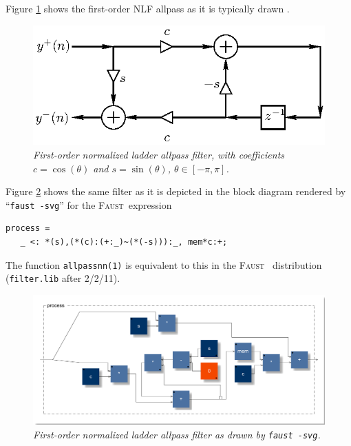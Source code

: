 \documentclass[twoside,a4paper]{article}
\newcommand{\Faust}{\textsc{Faust}}
\newcommand{\Faustsp}{\Faust\ }
\begin{document}
Figure \ref{nlf} shows the first-order NLF allpass as it is typically
drawn \cite{MG,PASP}.

\begin{figure}[ht]
\centerline{\includegraphics{eps/nlf.eps}}
\caption{\label{nlf}{\it First-order normalized ladder allpass filter, with
coefficients $c=\cos(\theta)$ and $s=\sin(\theta)$, $\theta\in[-\pi,\pi]$.}}
\end{figure}

Figure \ref{nlf1} shows the same filter as it is depicted in the block diagram
rendered by ``\texttt{faust -svg}'' for the \Faustsp expression
\begin{verbatim}
process = 
   _ <: *(s),(*(c):(+:_)~(*(-s))):_, mem*c:+;
\end{verbatim}
The function \texttt{allpassnn(1)} is equivalent to this in the \Faustsp
distribution (\texttt{filter.lib} after 2/2/11).

\begin{figure}[ht]
\centerline{\includegraphics[scale=0.33]{fig/nlf1.pdf}}
\caption{\label{nlf1}{\it First-order normalized ladder allpass filter
    as drawn by \texttt{faust -svg}.}}
\end{figure}
\end{document}
